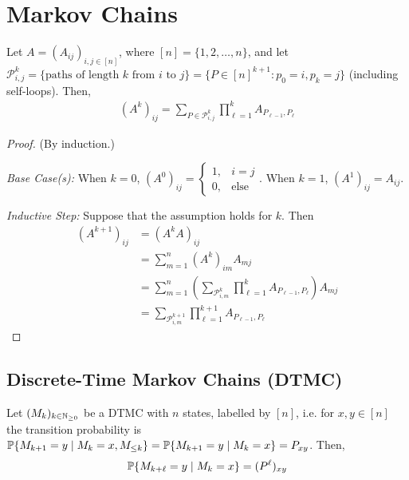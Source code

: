 \documentclass[12pt]{article}
\begin{document}
\section{Markov Chains}

\begin{lemma}

Let $A=(A_{ij})_{i,j\in[n]}$, where $[n] = \{1, 2, \dots, n \}$,
and let $\mathcal{P}_{i,j}^k = \{ \text{paths of length $k$ from $i$ to $j$} \} 
	= \{ P\in[n]^{k+1} : p_0=i, p_k=j \}$ (including self-loops).	
Then,
$$\begin{aligned}
(A^k)_{ij} = \sum\limits_{P\in\mathcal{P}_{i,j}^k} \prod\limits_{\ell=1}^{k} A_{P_{\ell-1}, P_{\ell}}
\end{aligned}$$
\end{lemma}

\begin{proof}
(By induction.)

\textit{Base Case(s):}
When $k=0$, $(A^0)_{ij} = \begin{cases} 1, & i=j \\  0, & \text{else}  \end{cases}$.
When $k=1$, $(A^1)_{ij} = A_{ij}$. 

\textit{Inductive Step:}
Suppose that the assumption holds for $k$. Then
$$\begin{aligned}
(A^{k+1})_{ij} &= (A^{k}A)_{ij} \\
			&= \sum\limits_{m=1}^{n} (A^k)_{im}A_{mj} \\
			&= \sum\limits_{m=1}^{n}\left(
				  \sum\limits_{\mathcal{P}_{i,m}^k} \prod\limits_{\ell=1}^k A_{P_{\ell-1}, P_\ell} 
			      \right) A_{mj} \\
			&= \sum\limits_{\mathcal{P}_{i,m}^{k+1}} \prod\limits_{\ell=1}^{k+1} A_{P_{\ell-1}, P_\ell}
\end{aligned}$$
\end{proof}

\subsection*{Discrete-Time Markov Chains (DTMC)}
Let $(M_k)_{k\in \N_{\geq 0}}$ be a DTMC with $n$ states, labelled by $[n]$, i.e. for $x,y\in[n]$ the transition probability is $\P\{ M_{k+1}=y \mid M_k=x, M_{\leq k} \} = \P\{ M_{k+1}=y \mid M_k=x \} = P_{xy}$. Then,
$$\begin{aligned}
	\P\{ M_{k+\ell} = y \mid M_k = x \} = (P^\ell)_{xy}
\end{aligned}$$
\end{document}
